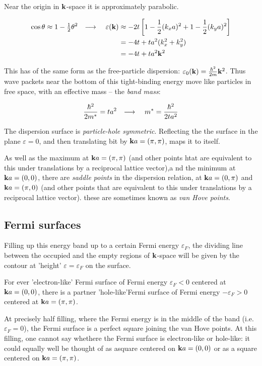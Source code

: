 \documentclass[10pt, a4paper, twocolumn]{article}
\newcommand{\arr}{\ensuremath{\longrightarrow\ }}
\newcommand{\eps}{\ensuremath{\varepsilon _0}}
\begin{document}
Near the origin in $\vb k$-space it is approximately parabolic.

\begin{equation*}
\begin{aligned}
\cos \theta \approx 1-\tfrac12 \theta ^2 \qq{\arr}
\varepsilon (\vb k) &\approx
-2t\left[ 1 - \frac12 (k_xa)^2+1-\frac12 (k_ya)^2\right]
\\&=-4t+ta^2(k_x^2+k_y^2)
\\&=-4t+ta^2\vb k^2
\end{aligned}
\end{equation*}

This has of the same form as the free-particle dispersion:
$\eps (\vb k)=\frac{\hbar ^2}{2m}\vb k^2$. Thus wave packets near the bottom of this tight-binding energy move like particles in free space, with an effective mass -- the \emph{band mass}:

\[\frac{\hbar ^2}{2m^*} = ta^2 \qq{\arr}
m^*=\frac{\hbar ^2}{2ta^2} \]

The dispersion surface is \emph{particle-hole symmetric}. Reflecting the the surface in the plane $\varepsilon =0$, and then translating bit by $\vb ka =(\pi,\pi)$, maps it to itself.

As well as the maximum at $\vb ka=(\pi,\pi)$ (and other points htat are equivalent to this under translations by a reciprocal lattice vector),a nd the minimum at $\vb ka=(0,0)$, there are \emph{saddle points} in the dispersion relation, at $\vb ka=(0,\pi)$ and $\vb ka=(\pi,0)$ (and other points that are equivalent to this under translations by a reciprocal lattice vector). these are sometimes known as \emph{van Hove points}.

\subsection{Fermi surfaces}

Filling up this energy band up to a certain Fermi energy $\varepsilon _F$, the dividing line between the occupied and the empty regions of $\vb k$-space will be given by the contour at 'height' $\varepsilon = \varepsilon _F$ on the surface.

For ever 'electron-like' Fermi surface of Fermi energy $\varepsilon _F<0$ centered at $\vb k a=(0,0)$, there is a partner 'hole-like'Fermi surface of Fermi energy $-\varepsilon _F>0$ centered at $\vb ka=(\pi,\pi)$.

At precisely half filling, where the Fermi energy is in the middle of the band (i.e. $\varepsilon _F=0$), the Fermi surface is a perfect square joining the van Hove points. At this filling, one cannot say whethere the Fermi surface is electron-like or hole-like: it could equally well be thought of as  asquare centered on $\vb ka=(0,0)$ or as a square centered on $\vb k a=(\pi,\pi)$.
\end{document}
